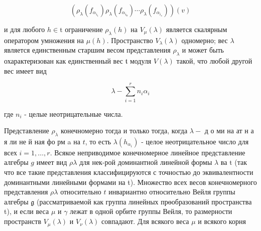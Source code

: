 \documentclass[10pt]{article}
\begin{document}
\[

\left(\rho_{\lambda}\left(f_{\alpha_{i_{1}}}\right) \rho_{\lambda}\left(f_{\alpha_{i_{8}}}\right) \cdots \rho_{\lambda}\left(f_{\alpha_{i_{s}}}\right)\right)(v)

\]



и для любого $h \in \mathrm{t}$ ограничение $\rho_{\lambda}(h)$ на $V_{\mu}(\lambda)$ является скалярным оператором умножения на $\mu(h)$. Пространство $V_{\lambda}(\lambda)$ одномерно; вес $\lambda$ является единственным старшим весом представления $\rho_{\lambda}$ и может быть охарактеризован как единственный вес $\mathfrak{t}$ модуля $V(\lambda)$ такой, что любой другой вес имеет вид



\[

\lambda-\sum_{i=1}^{r} n_{i} \alpha_{i}

\]



где $n_{i}$ - целые неотрицательные числа.



Представление $\rho_{\lambda}$ конечномерно тогда и только тогда, когда $\lambda-$ д о ми на ат н а я ли не й ная фо рм a на $t$, то есть $\lambda\left(h_{\alpha_{i}}\right)$ - целое неотрицательное число для всех $i=1, \ldots, r$. Всякое неприводимое конечномерное линейное представление алгебры $g$ имеет вид $\rho \lambda$ для нек-рой доминантной линейной формы $\lambda$ ва $\mathrm{t}$ (так что все такие представления классифицируются с точностью до эквивалентности доминантными линейными формами на t). Множество всех весов конечномерного представления $\rho \lambda$ относительно $t$ инвариантно относительно Вейля группы алгебры $\mathfrak{g}$ (рассматриваемой как группа линейных прөобразований пространства t), и если веса $\mu$ и $\gamma$ лежат в одной орбите группы Вейля, то размерности пространств $V_{\mu}(\lambda)$ и $V_{\nu}(\lambda)$ совпадают. Для всякого веса $\mu$ и всякого корня
\end{document}
